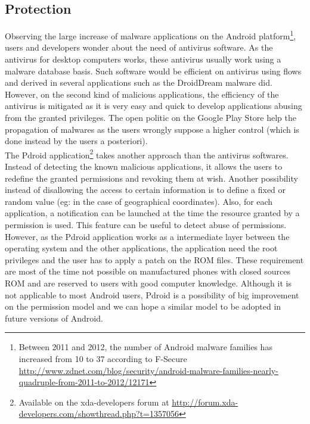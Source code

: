 \subsection{Protection}
Observing the large increase of malware applications on the Android platform\footnote{Between 2011 and 2012, the number of Android malware families has increased from 10 to 37 according to F-Secure \url{http://www.zdnet.com/blog/security/android-malware-families-nearly-quadruple-from-2011-to-2012/12171}}, users and developers wonder about the need of antivirus software.
As the antivirus for desktop computers works, these antivirus usually work using a malware database basis.
Such software would be efficient on antivirus using flows and derived in several applications such as the DroidDream malware did.
However, on the second kind of malicious applications, the efficiency of the antivirus is mitigated as it is very easy and quick to develop applications abusing from the granted privileges.
The open politic on the Google Play Store help the propagation of malwares as the users wrongly suppose a higher control (which is done instead by the users a posteriori).\\

The Pdroid application\footnote{Available on the xda-developers forum at \url{http://forum.xda-developers.com/showthread.php?t=1357056}} takes another approach than the antivirus softwares.
Instead of detecting the known malicious applications, it allows the users to redefine the granted permissions and revoking them at wish.
Another possibility instead of disallowing the access to certain information is to define a fixed or random value (eg: in the case of geographical coordinates).
Also, for each application, a notification can be launched at the time the resource granted by a permission is used.
This feature can be useful to detect abuse of permissions.
However, as the Pdroid application works as a intermediate layer between the operating system and the other applications, the application need the root privileges and the user has to apply a patch on the ROM files.
These requirement are most of the time not possible on manufactured phones with closed sources ROM and are reserved to users with good computer knowledge.
Although it is not applicable to most Android users, Pdroid is a possibility of big improvement on the permission model and we can hope a similar model to be adopted in future versions of Android.
